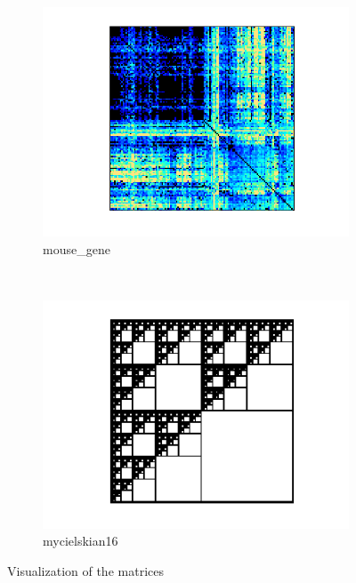 \documentclass[conference]{IEEEtran}
\begin{document}
\begin{figure}[h!]
	\begin{subfigure}{0.40\linewidth}
		\centering
		\includegraphics[width=\linewidth]{model_images/mouse_gene}
		\caption{mouse\_gene}
		\label{dat:mouse_gene}
	\end{subfigure}
	~
	\begin{subfigure}{0.40\linewidth}
		\centering
		\includegraphics[width=\linewidth]{model_images/mycielskian16}
		\caption{mycielskian16}
		\label{dat:mycielskian16}
	\end{subfigure}


	\caption{Visualization of the matrices}
	\label{img:data-vis}
\end{figure}
\end{document}
